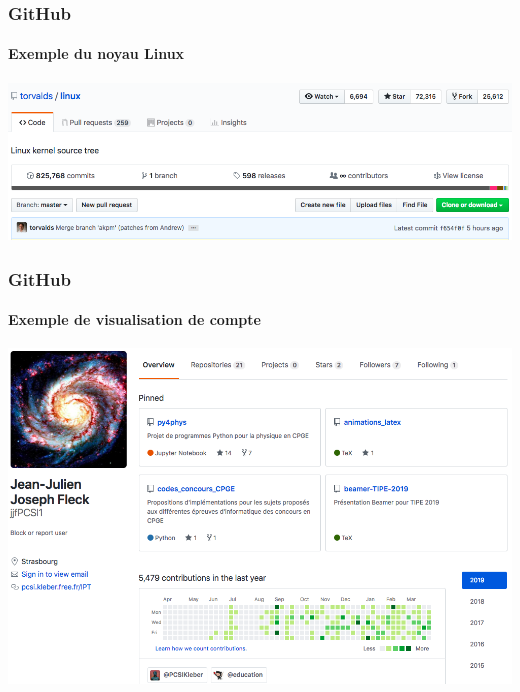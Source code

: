 \begin{frame}
\frametitle{GitHub}
\framesubtitle{Exemple du noyau Linux}

	\begin{center}
			\includegraphics[width=\linewidth]{figures/github_linux.png}
	\end{center}

\end{frame}

\begin{frame}
\frametitle{GitHub}
\framesubtitle{Exemple de visualisation de compte}

	\begin{center}
			\includegraphics[width=\linewidth]{figures/github_jjfPCSI1.png}
	\end{center}

\end{frame}

